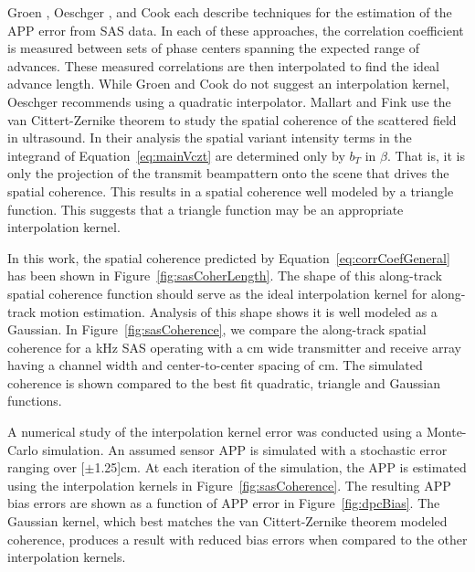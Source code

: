 \documentclass[conference]{IEEEtran}
\begin{document}
Groen \cite{Groen:2006a}, Oeschger \cite{Oeschger:2006a}, and Cook \cite{Cook:2007b} each describe techniques for the estimation of the APP error from SAS data. In each of these approaches, the correlation coefficient is measured between sets of phase centers spanning the expected range of advances. These measured correlations are then interpolated to find the ideal advance length. While Groen and Cook do not suggest an interpolation kernel, Oeschger recommends using a quadratic interpolator. Mallart and Fink \cite{Mallart:1991a} use the van Cittert-Zernike theorem to study the spatial coherence of the scattered field in ultrasound. In their analysis the spatial variant intensity terms in the integrand of Equation~\ref{eq:mainVczt} are determined only by $b_T$ in $\beta$. That is, it is only the projection of the transmit beampattern onto the scene that drives the spatial coherence. This results in a spatial coherence well modeled by a triangle function. This suggests that a triangle function may be an appropriate interpolation kernel.

In this work, the spatial coherence predicted by Equation~\ref{eq:corrCoefGeneral} has been shown in Figure~\ref{fig:sasCoherLength}. The shape of this along-track spatial coherence function should serve as the ideal interpolation kernel for along-track motion estimation. Analysis of this shape shows it is well modeled as a Gaussian. In Figure~\ref{fig:sasCoherence}, we compare the along-track spatial coherence for a \unit[120]{kHz} SAS operating with a \unit[5]{cm} wide transmitter and receive array having a channel width and center-to-center spacing of \unit[5]{cm}. The simulated coherence is shown compared to the best fit quadratic, triangle and Gaussian functions.

A numerical study of the interpolation kernel error was conducted using a Monte-Carlo simulation. An assumed sensor APP is simulated with a stochastic error ranging over \unit[$\pm$1.25]{cm}. At each iteration of the simulation, the APP is estimated using the interpolation kernels in Figure~\ref{fig:sasCoherence}. The resulting APP bias errors are shown as a function of APP error in Figure~\ref{fig:dpcBias}. The Gaussian kernel, which best matches the van Cittert-Zernike theorem modeled coherence, produces a result with reduced bias errors when compared to the other interpolation kernels.
\end{document}
